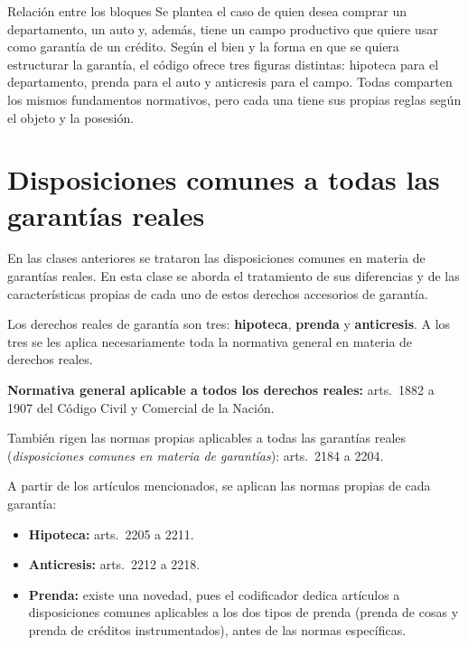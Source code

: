 \documentclass[12pt,oneside]{book}
\begin{document}
\begin{example}{Relación entre los bloques}
Se plantea el caso de quien desea comprar un departamento, un auto y, además, tiene un campo productivo que quiere usar como garantía de un crédito. Según el bien y la forma en que se quiera estructurar la garantía, el código ofrece tres figuras distintas: hipoteca para el departamento, prenda para el auto y anticresis para el campo. Todas comparten los mismos fundamentos normativos, pero cada una tiene sus propias reglas según el objeto y la posesión.
\end{example}

\section{Disposiciones comunes a todas las garantías reales}

En las clases anteriores se trataron las disposiciones comunes en materia de garantías reales. En esta clase se aborda el tratamiento de sus diferencias y de las características propias de cada uno de estos derechos accesorios de garantía.

Los derechos reales de garantía son tres: \textbf{hipoteca}, \textbf{prenda} y \textbf{anticresis}. A los tres se les aplica necesariamente toda la normativa general en materia de derechos reales.

\begin{important}
\textbf{Normativa general aplicable a todos los derechos reales:} arts.\ 1882 a 1907 del Código Civil y Comercial de la Nación.

También rigen las normas propias aplicables a todas las garantías reales (\textit{disposiciones comunes en materia de garantías}): arts.\ 2184 a 2204.
\end{important}

A partir de los artículos mencionados, se aplican las normas propias de cada garantía:

\begin{itemize}
    \item \textbf{Hipoteca:} arts.\ 2205 a 2211.
    \item \textbf{Anticresis:} arts.\ 2212 a 2218.
    \item \textbf{Prenda:} existe una novedad, pues el codificador dedica artículos a disposiciones comunes aplicables a los dos tipos de prenda (prenda de cosas y prenda de créditos instrumentados), antes de las normas específicas.
\end{itemize}
\end{document}
